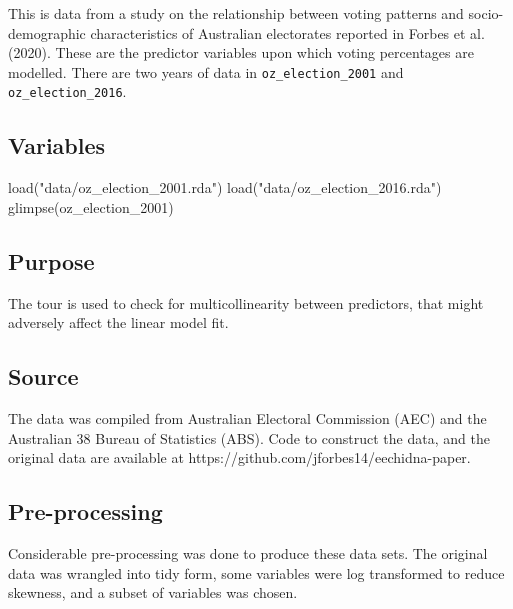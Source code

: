 \documentclass[
  letterpaper,
]{book}
\newenvironment{Shaded}{\begin{snugshade}}{\end{snugshade}}
\newcommand{\FunctionTok}[1]{\textcolor[rgb]{0.28,0.35,0.67}{#1}}
\newcommand{\NormalTok}[1]{\textcolor[rgb]{0.00,0.23,0.31}{#1}}
\newcommand{\StringTok}[1]{\textcolor[rgb]{0.13,0.47,0.30}{#1}}
\begin{document}
This is data from a study on the relationship between voting patterns
and socio-demographic characteristics of Australian electorates reported
in Forbes et al. (2020). These are the predictor variables upon which
voting percentages are modelled. There are two years of data in
\texttt{oz\_election\_2001} and \texttt{oz\_election\_2016}.

\hypertarget{variables-2}{%
\subsection*{Variables}\label{variables-2}}

\begin{Shaded}
\begin{Highlighting}[]
\FunctionTok{load}\NormalTok{(}\StringTok{"data/oz\_election\_2001.rda"}\NormalTok{)}
\FunctionTok{load}\NormalTok{(}\StringTok{"data/oz\_election\_2016.rda"}\NormalTok{)}
\FunctionTok{glimpse}\NormalTok{(oz\_election\_2001)}
\end{Highlighting}
\end{Shaded}

\hypertarget{purpose-2}{%
\subsection*{Purpose}\label{purpose-2}}

The tour is used to check for multicollinearity between predictors, that
might adversely affect the linear model fit.

\hypertarget{source-2}{%
\subsection*{Source}\label{source-2}}

The data was compiled from Australian Electoral Commission (AEC) and the
Australian 38 Bureau of Statistics (ABS). Code to construct the data,
and the original data are available at
https://github.com/jforbes14/eechidna-paper.

\hypertarget{pre-processing-2}{%
\subsection*{Pre-processing}\label{pre-processing-2}}

Considerable pre-processing was done to produce these data sets. The
original data was wrangled into tidy form, some variables were log
transformed to reduce skewness, and a subset of variables was chosen.
\end{document}
